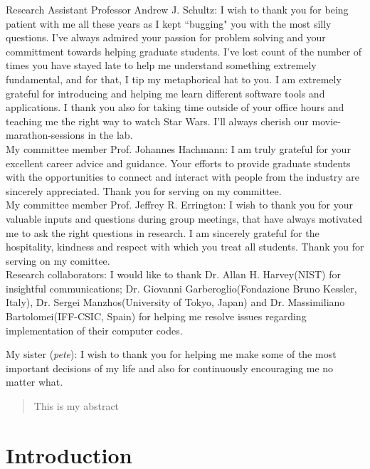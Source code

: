 \documentclass[a4paper,11pt,english,twoside]{ubthesis}
\begin{document}
\begin{ubfrontmatter}
\begin{acknowledgements}
    \noindent Research Assistant Professor Andrew J. Schultz: I wish to thank you for being patient with me all these years as I kept ``bugging" you with the most silly questions. I've always admired your passion for problem solving and your committment towards helping graduate students. I've lost count of the number of times you have stayed late to help me understand something extremely fundamental, and for that, I tip my metaphorical hat to you. I am extremely grateful for introducing and helping me learn different software tools and applications. I thank you also for taking time outside of your office hours and teaching me the right way to watch Star Wars. I'll always cherish our movie-marathon-sessions in the lab.\\

    \noindent My committee member Prof. Johannes Hachmann: I am truly grateful for your excellent career advice and guidance. Your efforts to provide graduate students with the opportunities to connect and interact with people from the industry are sincerely appreciated. Thank you for serving on my committee.\\

    \noindent My committee member Prof. Jeffrey R. Errington: I wish to thank you for your valuable inputs and questions during group meetings, that have always motivated me to ask the right questions in research. I am sincerely grateful for the hospitality, kindness and respect with which you treat all students. Thank you for serving on my comittee.\\

    \noindent Research collaborators: I would like to thank Dr. Allan H. Harvey(NIST) for insightful communications; Dr. Giovanni Garberoglio(Fondazione Bruno Kessler, Italy), Dr. Sergei Manzhos(University of Tokyo, Japan) and Dr. Massimiliano Bartolomei(IFF-CSIC, Spain) for helping me resolve issues regarding implementation of their computer codes.

    \noindent My sister (\emph{pete}): I wish to thank you for helping me make some of the most important decisions of my life and also for continuously encouraging me no matter what.\\

    
\end{acknowledgements}
\tableofcontents
\cleardoublepage
\listoffigures
\cleardoublepage
\listoftables
\cleardoublepage
\begin{abstract}
This is my abstract
\end{abstract}
\end{ubfrontmatter}

\chapter{Introduction}

\begin{ubbackmatter}
\end{ubbackmatter}
\end{document}
